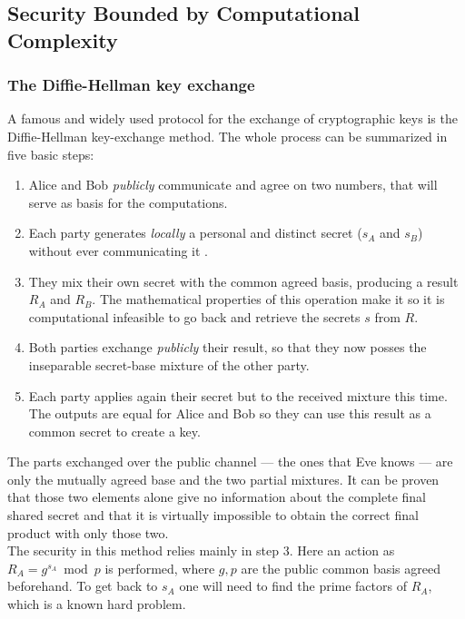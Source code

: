	\subsection{Security Bounded by Computational Complexity}
	
		\subsubsection{The Diffie-Hellman key exchange}
	
		A famous and widely used protocol for the exchange of cryptographic keys is the Diffie-Hellman key-exchange method.
	The whole process can be summarized in five basic steps:
	\begin{enumerate}
		\item Alice and Bob \emph{publicly} communicate and agree on two numbers, that will serve as basis for the computations.
		\item Each party generates \emph{locally} a personal and distinct secret ($s_A$ and $s_B$) without ever communicating it .
		\item They mix their own secret with the common agreed basis, producing a result $R_A$ and $R_B$. The mathematical properties of this operation make it so it is computational infeasible to go back and retrieve the secrets $s$ from $R$.
		\item Both parties exchange \emph{publicly} their result, so that they now posses the inseparable secret-base mixture of the other party.
		\item Each party applies again their secret but to the received mixture this time. The outputs are equal for Alice and Bob so they can use this result as a common secret to create a key.
	\end{enumerate}	 
	The parts exchanged over the public channel --- the ones that Eve knows --- are only the mutually agreed base and the two partial mixtures. 
	It can be proven that those two elements alone give no information about the complete final shared secret and that it is virtually impossible to obtain the correct final product with only those two.\\  
	
	The security in this method relies mainly in step 3. Here an action as $ R_A = g^{s_A} \bmod p $ is performed, where $g,p$ are the public common basis agreed beforehand. To get back to $s_A$  one will need to find the prime factors of $R_A$, which is a known hard problem. 
		
